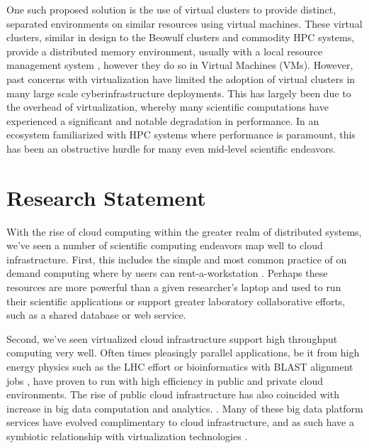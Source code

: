 

One such proposed solution is the use of virtual clusters \cite{Foster2006} to provide distinct, separated environments on similar resources using virtual machines. These virtual clusters, similar in design to the Beowulf clusters and commodity HPC systems, provide a distributed memory environment, usually with a local resource management system \cite{czajkowski1998resource}, however they do so in Virtual Machines (VMs).  However, past concerns with virtualization have limited the adoption of virtual clusters in many large scale cyberinfrastructure deployments. This has largely been due to the overhead of virtualization, whereby many scientific computations have experienced a significant and notable degradation in performance.  In an ecosystem familiarized with HPC systems where performance is paramount, this has been an obstructive hurdle for many even mid-level scientific endeavors.

\section{Research Statement}
\label{sec:stmt}


With the rise of cloud computing within the greater realm of distributed systems, we've seen a number of scientific computing endeavors map well to cloud infrastructure. First, this includes the simple and most common practice of on demand computing where by users can rent-a-workstation \cite{kondo2009cost}. Perhaps these resources are more powerful than a given researcher's laptop and used to run their scientific applications or support greater laboratory collaborative efforts, such as a shared database or web service. 

Second, we've seen virtualized cloud infrastructure support high throughput computing very well. Often times pleasingly parallel applications, be it from high energy physics such as the LHC effort \cite{buncic2010cernvm, bell2015scaling} or bioinformatics with BLAST alignment jobs \cite{menon2012cloud}, have proven to run with high efficiency in public and private cloud environments. The rise of public cloud infrastructure has also coincided with increase in big data computation and analytics.
.
Many of these big data platform services have evolved complimentary to cloud infrastructure, and as such have a symbiotic relationship with virtualization technologies \cite{gunarathne2010mapreduce}.  

